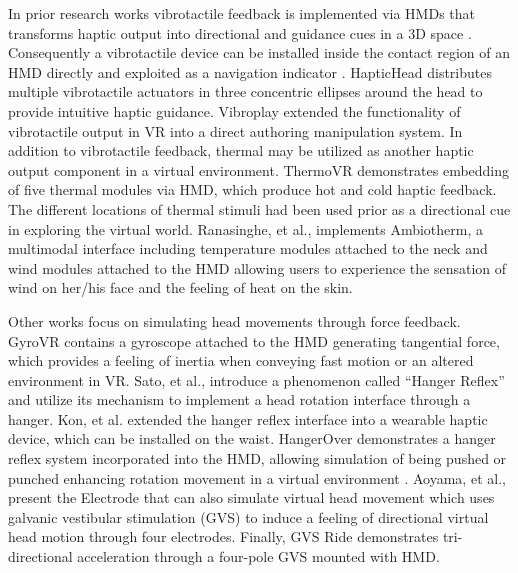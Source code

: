 In prior research works vibrotactile feedback is implemented via HMDs that transforms haptic output into directional and guidance cues in a 3D space \cite{VibGuide, HapticHead, Vibroplay}. Consequently a vibrotactile device can be installed inside the contact region of an HMD directly and exploited as a navigation indicator \cite{VibGuide}. HapticHead \cite{HapticHead} distributes multiple vibrotactile actuators in three concentric ellipses around the head to provide intuitive haptic guidance. Vibroplay \cite{Vibroplay} extended the functionality of vibrotactile output in VR into a direct authoring manipulation system. In addition to vibrotactile feedback, thermal may be utilized as another haptic output component in a virtual environment. ThermoVR \cite{ThermoVR} demonstrates embedding of five thermal modules via HMD, which produce hot and cold haptic feedback. The different locations of thermal stimuli had been used prior as a directional cue in exploring the virtual world. Ranasinghe, et al., \cite{Ambiotherm} implements Ambiotherm, a multimodal interface including temperature modules attached to the neck and wind modules attached to the HMD allowing users to experience the sensation of wind on her/his face and the feeling of heat on the skin. 

Other works focus on simulating head movements through force feedback. GyroVR \cite{GyroVR} contains a gyroscope attached to the HMD generating tangential force, which provides a feeling of inertia when conveying fast motion or an altered environment in VR. Sato, et al., \cite{hangerreflex09} introduce a phenomenon called “Hanger Reflex” and utilize its mechanism to implement a head rotation interface through a hanger. Kon, et al. \cite{hangerreflex16} extended the hanger reflex interface into a wearable haptic device, which can be installed on the waist. HangerOver \cite{HangerOVER} demonstrates a hanger reflex system incorporated into the HMD, allowing simulation of being pushed or punched enhancing rotation movement in a virtual environment \cite{HangerOVER}. Aoyama, et al., \cite{GVS} present the Electrode that can also simulate virtual head movement which uses galvanic vestibular stimulation (GVS) to induce a feeling of directional virtual head motion through four electrodes. Finally, GVS Ride \cite{GVSRIDE} demonstrates tri-directional acceleration through a four-pole GVS mounted with HMD.

